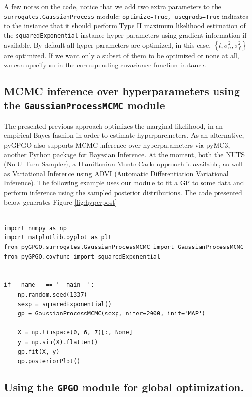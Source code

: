 \documentclass[10pt,a4paper,twoside]{book}
\begin{document}
A few notes on the code, notice that we add two extra parameters to the \texttt{surrogates.GaussianProcess} module: \texttt{optimize=True, usegrads=True} indicates to the instance that it should perform Type II maximum likelihood estimation of the \texttt{squaredExponential} instance hyper-parameters using gradient information if available. By default all hyper-parameters are optimized, in this case, $\left\lbrace l, \sigma_n^2, \sigma_f^2 \right\rbrace$ are optimized. If we want only a subset of them to be optimized or none at all, we can specify so in the corresponding covariance function instance. 


\subsection{MCMC inference over hyperparameters using the \texttt{GaussianProcessMCMC} module}

The presented previous approach optimizes the marginal likelihood, in an empirical Bayes fashion in order to estimate hyperparemeters. As an alternative, pyGPGO also supports MCMC inference over hyperparameters via pyMC3, another Python package for Bayesian Inference. At the moment, both the NUTS \cite{Hoffman2014} (No-U-Turn Sampler), a Hamiltonian Monte Carlo approach is available, as well as Variational Inference using ADVI \cite{Kucukelbir2016} (Automatic Differentiation Variational Inference). The following example uses our module to fit a GP to some data and perform inference using the sampled posterior distributions. The code presented below generates Figure \ref{fig:hyperpost}.

\begin{verbatim}
               
import numpy as np
import matplotlib.pyplot as plt
from pyGPGO.surrogates.GaussianProcessMCMC import GaussianProcessMCMC
from pyGPGO.covfunc import squaredExponential


if __name__ == '__main__':
    np.random.seed(1337)
    sexp = squaredExponential()
    gp = GaussianProcessMCMC(sexp, niter=2000, init='MAP')

    X = np.linspace(0, 6, 7)[:, None]
    y = np.sin(X).flatten()
    gp.fit(X, y)
    gp.posteriorPlot()               
\end{verbatim}


\subsection{Using the \texttt{GPGO} module for global optimization.}
\end{document}
